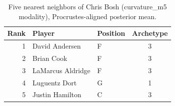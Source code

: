 \begin{table}[htbp]
  \centering\small
  \begin{tabular}{rllc}
    \toprule
    Rank & Player & Position & Archetype \\
    \midrule
    1 & David Andersen & F & 3 \\
    2 & Brian Cook & F & 3 \\
    3 & LaMarcus Aldridge & F & 3 \\
    4 & Luguentz Dort & G & 1 \\
    5 & Justin Hamilton & C & 3 \\
    \bottomrule
  \end{tabular}
  \caption{Five nearest neighbors of Chris Bosh (curvature_m5 modality), Procrustes-aligned posterior mean.}
  \label{tab:Chris_Bosh_neighbors_curvature_m5}
\end{table}

